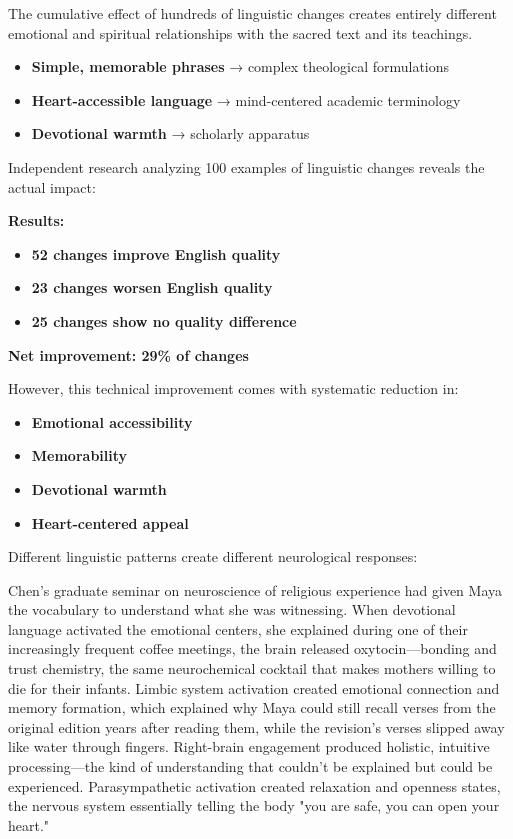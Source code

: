 \documentclass[12pt,twoside]{book}
\begin{document}
The cumulative effect of hundreds of linguistic changes creates entirely different emotional and spiritual relationships with the sacred text and its teachings.

\begin{itemize}
\item \textbf{\textbf{Simple, memorable phrases}} → complex theological formulations
\item \textbf{\textbf{Heart-accessible language}} → mind-centered academic terminology
\item \textbf{\textbf{Devotional warmth}} → scholarly apparatus
\end{itemize}

Independent research analyzing 100 examples of linguistic changes reveals the actual impact:

\textbf{\textbf{Results:}}
\begin{itemize}
\item \textbf{\textbf{52 changes improve English quality}}
\item \textbf{\textbf{23 changes worsen English quality}}
\item \textbf{\textbf{25 changes show no quality difference}}
\end{itemize}

\textbf{\textbf{Net improvement: 29\% of changes}}

However, this technical improvement comes with systematic reduction in:
\begin{itemize}
\item \textbf{\textbf{Emotional accessibility}}
\item \textbf{\textbf{Memorability}}
\item \textbf{\textbf{Devotional warmth}}
\item \textbf{\textbf{Heart-centered appeal}}
\end{itemize}

Different linguistic patterns create different neurological responses:

Chen's graduate seminar on neuroscience of religious experience had given Maya the vocabulary to understand what she was witnessing. When devotional language activated the emotional centers, she explained during one of their increasingly frequent coffee meetings, the brain released oxytocin—bonding and trust chemistry, the same neurochemical cocktail that makes mothers willing to die for their infants. Limbic system activation created emotional connection and memory formation, which explained why Maya could still recall verses from the original edition years after reading them, while the revision's verses slipped away like water through fingers. Right-brain engagement produced holistic, intuitive processing—the kind of understanding that couldn't be explained but could be experienced. Parasympathetic activation created relaxation and openness states, the nervous system essentially telling the body "you are safe, you can open your heart."
\end{document}

